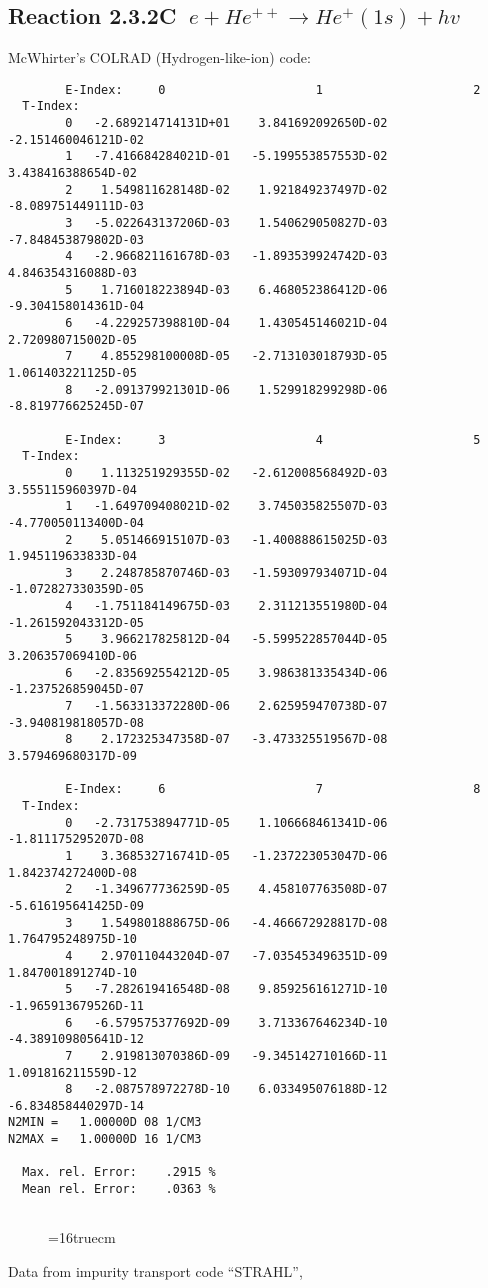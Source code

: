 \documentclass[12pt,dvipdfmx]{article}
\begin{document}
\subsection{
Reaction 2.3.2C   $\  e + He^{++} \rightarrow  He^+(1s) + hv$
}
McWhirter's COLRAD (Hydrogen-like-ion) code: \cite{kn:McWhirter}
\begin{small}\begin{verbatim}
        E-Index:     0                     1                     2
  T-Index:
        0   -2.689214714131D+01    3.841692092650D-02   -2.151460046121D-02
        1   -7.416684284021D-01   -5.199553857553D-02    3.438416388654D-02
        2    1.549811628148D-02    1.921849237497D-02   -8.089751449111D-03
        3   -5.022643137206D-03    1.540629050827D-03   -7.848453879802D-03
        4   -2.966821161678D-03   -1.893539924742D-03    4.846354316088D-03
        5    1.716018223894D-03    6.468052386412D-06   -9.304158014361D-04
        6   -4.229257398810D-04    1.430545146021D-04    2.720980715002D-05
        7    4.855298100008D-05   -2.713103018793D-05    1.061403221125D-05
        8   -2.091379921301D-06    1.529918299298D-06   -8.819776625245D-07

        E-Index:     3                     4                     5
  T-Index:
        0    1.113251929355D-02   -2.612008568492D-03    3.555115960397D-04
        1   -1.649709408021D-02    3.745035825507D-03   -4.770050113400D-04
        2    5.051466915107D-03   -1.400888615025D-03    1.945119633833D-04
        3    2.248785870746D-03   -1.593097934071D-04   -1.072827330359D-05
        4   -1.751184149675D-03    2.311213551980D-04   -1.261592043312D-05
        5    3.966217825812D-04   -5.599522857044D-05    3.206357069410D-06
        6   -2.835692554212D-05    3.986381335434D-06   -1.237526859045D-07
        7   -1.563313372280D-06    2.625959470738D-07   -3.940819818057D-08
        8    2.172325347358D-07   -3.473325519567D-08    3.579469680317D-09

        E-Index:     6                     7                     8
  T-Index:
        0   -2.731753894771D-05    1.106668461341D-06   -1.811175295207D-08
        1    3.368532716741D-05   -1.237223053047D-06    1.842374272400D-08
        2   -1.349677736259D-05    4.458107763508D-07   -5.616195641425D-09
        3    1.549801888675D-06   -4.466672928817D-08    1.764795248975D-10
        4    2.970110443204D-07   -7.035453496351D-09    1.847001891274D-10
        5   -7.282619416548D-08    9.859256161271D-10   -1.965913679526D-11
        6   -6.579575377692D-09    3.713367646234D-10   -4.389109805641D-12
        7    2.919813070386D-09   -9.345142710166D-11    1.091816211559D-12
        8   -2.087578972278D-10    6.033495076188D-12   -6.834858440297D-14
N2MIN =   1.00000D 08 1/CM3
N2MAX =   1.00000D 16 1/CM3

  Max. rel. Error:    .2915 %
  Mean rel. Error:    .0363 %


\end{verbatim}\end{small}
\begin{figure} \label{2.3.2C}
\epsfxsize=16truecm
\end{figure}
\newpage
Data from impurity transport code ``STRAHL'', \cite{kn:Behringer}
\end{document}

